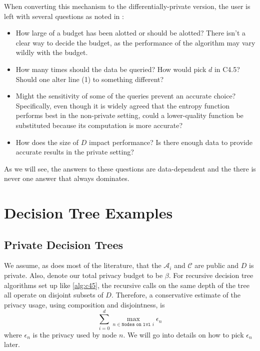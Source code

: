 \documentclass[11pt]{article}
\begin{document}
When converting this mechanism to the differentially-private version, the user is left with several questions as noted in \cite{Fletcher:2016}:
\begin{itemize}
\item How large of a budget has been alotted or should be alotted? There isn't a clear way to decide the budget, as the performance of the algorithm may vary wildly with the budget.
\item How many times should the data be queried? How would pick $d$ in C4.5? Should one alter line (1) to something different?
\item Might the sensitivity of some of the queries prevent an accurate choice? Specifically, even though it is widely agreed that the entropy function performs best in the non-private setting, could a lower-quality function be substituted because its computation is more accurate?
\item How does the size of $D$ impact performance? Is there enough data to provide accurate results in the private setting?
\end{itemize}
As we will see, the answers to these questions are data-dependent and the there is never one answer that always dominates.

\section{Decision Tree Examples}
\subsection{Private Decision Trees}
We assume, as does most of the literature, that the $\mathcal{A}_i$ and $\mathcal{C}$ are public and $D$ is private. Also, denote our total privacy budget to be $\beta$.
For recursive decision tree algorithms set up like \ref{alg:c45}, the recursive calls on the same depth of the tree all operate on disjoint subsets of $D$. Therefore, a conservative estimate of the privacy usage, using composition and disjointness, is
\begin{equation}\label{eq:priv_est}
\sum_{i=0}^d \max_{n \in \texttt{Nodes on lvl }i} \epsilon_{n}
\end{equation}
where $\epsilon_n$ is the privacy used by node $n$. We will go into details on how to pick $\epsilon_n$ later.
\end{document}
